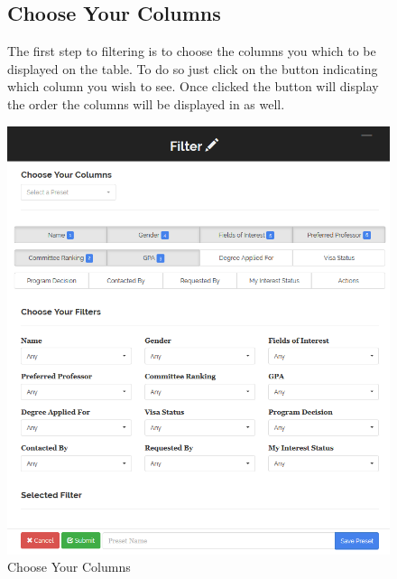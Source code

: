 \documentclass[fontsize=12pt,paper=letter,twoside]{scrartcl}
\begin{document}
\clearpage
\begin{figure}[!htb]
\subsection{Choose Your Columns}
The first step to filtering is to choose the columns you which to be displayed on the table. To do so just click on the button indicating which column you wish to see. Once clicked the button will display the order the columns will be displayed in as well.
\begin{center}
\includegraphics[width=.99\textwidth]{images/choose_columns.png}
\end{center}
\caption{Choose Your Columns}
\label{fig:choose_columns}
\end{figure}

\clearpage
\end{document}
